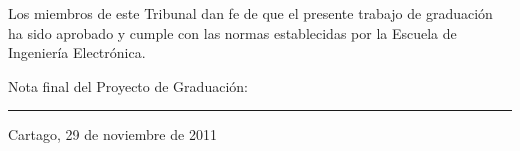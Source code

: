 \vfill

Los miembros de este Tribunal dan fe de que el presente trabajo de graduación
ha sido aprobado y cumple con las normas establecidas por la Escuela de
Ingeniería Electrónica.

\vfill

\begin{center}
  Nota final del Proyecto de Graduación: \rule{3cm}{0.5pt}
\end{center}
\vfill

\begin{center}
  Cartago, 29 de noviembre de 2011\par
\end{center}

\cleardoublepage

